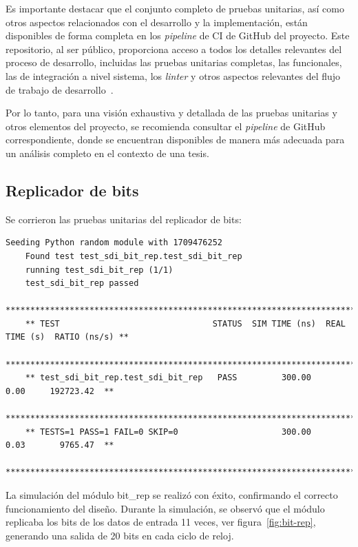  Es importante destacar que el conjunto completo de pruebas unitarias, así como
  otros aspectos relacionados con el desarrollo y la implementación, están
  disponibles de forma completa en los \textit{pipeline} de CI de GitHub del
  proyecto. Este repositorio, al ser público, proporciona acceso a todos los
  detalles relevantes del proceso de desarrollo, incluidas las pruebas unitarias
  completas, las funcionales, las de integración a nivel sistema, los \textit{linter}
  y otros aspectos relevantes del flujo de trabajo de desarrollo~\citep{github}.

  Por lo tanto, para una visión exhaustiva y detallada de las pruebas unitarias
  y otros elementos del proyecto, se recomienda consultar el \textit{pipeline} de
  GitHub correspondiente, donde se encuentran disponibles de manera más adecuada
  para un análisis completo en el contexto de una tesis.


\subsection{Replicador de bits}

  Se corrieron las pruebas unitarias del replicador de bits:

  {\tiny\begin{lstlisting}[caption= "Resultados \textit{test} replicador de bits.]
    Seeding Python random module with 1709476252
    Found test test_sdi_bit_rep.test_sdi_bit_rep
    running test_sdi_bit_rep (1/1)
    test_sdi_bit_rep passed
    *******************************************************************************************
    ** TEST                               STATUS  SIM TIME (ns)  REAL TIME (s)  RATIO (ns/s) **
    *******************************************************************************************
    ** test_sdi_bit_rep.test_sdi_bit_rep   PASS         300.00           0.00     192723.42  **
    *******************************************************************************************
    ** TESTS=1 PASS=1 FAIL=0 SKIP=0                     300.00           0.03       9765.47  **
    *******************************************************************************************
  \end{lstlisting}}

  La simulación del módulo bit\_rep se realizó con éxito, confirmando el correcto
  funcionamiento del diseño. Durante la simulación, se observó que el módulo
  replicaba los bits de los datos de entrada 11 veces, ver figura~\ref{fig:bit-rep},
  generando una salida de 20 bits en cada ciclo de reloj.


